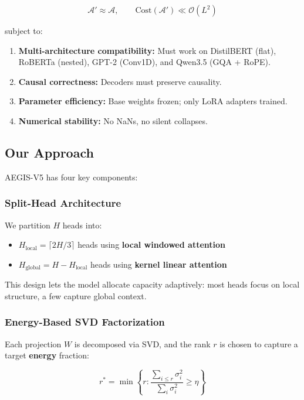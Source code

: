 \[
\mathcal{A}' \approx \mathcal{A}, \qquad
\text{Cost}(\mathcal{A}') \ll \mathcal{O}(L^2)
\]

subject to:

\begin{enumerate}
\item \textbf{Multi-architecture compatibility:} Must work on DistilBERT (flat),
  RoBERTa (nested), GPT-2 (Conv1D), and Qwen3.5 (GQA + RoPE).
\item \textbf{Causal correctness:} Decoders must preserve causality.
\item \textbf{Parameter efficiency:} Base weights frozen; only LoRA adapters trained.
\item \textbf{Numerical stability:} No NaNs, no silent collapses.

\end{enumerate}
\subsection{Our Approach}

AEGIS-V5 has four key components:

\subsubsection{Split-Head Architecture}

We partition $H$ heads into:

\begin{itemize}
\item $H_\text{local} = \lceil 2H/3 \rceil$ heads using \textbf{local windowed attention}
\item $H_\text{global} = H - H_\text{local}$ heads using \textbf{kernel linear attention}

\end{itemize}
This design lets the model allocate capacity adaptively: most heads focus 
on local structure, a few capture global context.

\subsubsection{Energy-Based SVD Factorization}

Each projection $W$ is decomposed via SVD, and the rank $r$ is chosen to 
capture a target \textbf{energy} fraction:

\[
r^* = \min \left\{ r : \frac{\sum_{i \leq r} \sigma_i^2}{\sum_i \sigma_i^2} \geq \eta \right\}
\]

